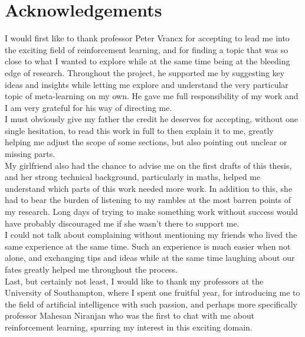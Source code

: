 \documentclass[11pt,a4paper,oneside]{book}
\begin{document}
\medskip


\chapter*{Acknowledgements}
\thispagestyle{empty} 

\noindent I would first like to thank professor Peter Vrancx for accepting
to lead me into the exciting field of reinforcement learning, and for finding
a topic that was so close to what I wanted to explore while at the same
time being at the bleeding edge of research. Throughout the project, he
supported me by suggesting key ideas and insights while letting me explore
and understand the very particular topic of meta-learning on my own. He
gave me full responsibility of my work and I am very grateful for his way 
of directing me.\\

I must obviously give my father the credit he deserves for accepting, without
one single hesitation, to read this work in full to then explain it to me,
greatly helping me adjust the scope of some sections, but also pointing out
unclear or missing parts.\\

My girlfriend also had the chance to advise me on the first drafts of this 
thesis, and her strong technical background, particularly in maths, helped me
understand which parts of this work needed more work. In addition to this, she 
had to bear the burden of listening to my rambles at
the most barren points of my research. Long days of trying to make something
work without success would have probably discouraged me if she wasn't there
to support me.\\

I could not talk about complaining without mentioning my friends who lived the
same experience at the same time. Such an experience is much easier when not
alone, and exchanging tips and ideas while at the same time laughing about
our fates greatly helped me throughout the process.\\

Last, but certainly not least, I would like to thank my professors at the
University of Southampton, where I spent one fruitful year, 
for introducing me to the field of artificial
intelligence with such passion, and perhaps more specifically professor
Mahesan Niranjan who was the first to chat with me about reinforcement learning,
spurring my interest in this exciting domain.
\end{document}
